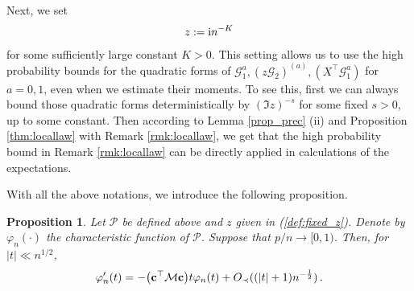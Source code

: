 \documentclass[12pt]{article}
\numberwithin{equation}{section}
\newtheorem{prop}{Proposition}
\theoremstyle{remark}
\newcommand{\1}{{\rm 1}\kern-0.24em{\rm I}}
\newcommand{\E}{{\rm I}\kern-0.18em{\rm E}}
\begin{document}
\begin{appendices}
 
 Next, we set 
\begin{align}\label{def:fixed_z}
z:= {\rm i} n^{-K}
\end{align}
for some sufficiently large constant $K>0$. This setting allows us to use the high probability bounds for the quadratic forms of $\mathcal{G}_1^{a}, (z\mathcal{G}_2)^{(a)}, ({X}^{\top} \mathcal{G}_1^{a})$  for $a=0,1$,  even when we estimate their moments. To see this, first we can always bound those quadratic forms deterministically by $(\Im z)^{-s}$ for some fixed $s>0$, up to some constant. Then according to Lemma \ref{prop_prec} (ii) and  Proposition \ref{thm:locallaw} with Remark \ref{rmk:locallaw}, we get that the high probability bound in Remark \ref{rmk:locallaw} can be directly  applied in calculations of the expectations.

With all the above notations, we introduce the following proposition.
 \begin{prop}\label{prop:rmeP}
 Let $ \mathcal{P}$ be defined above and $z$ given in (\ref{def:fixed_z}).  Denote by $\varphi_n(\cdot)$  the characteristic function of $ \mathcal{P}$. Suppose that $p/n\to[0,1)$.
Then, for $|t|\ll n^{1/2}$,
\begin{align*}
\varphi_n'(t) = - \big({\bf c}^{\top} \mathcal{M} {\bf c} \big) t \varphi_n(t)  + O_\prec((|t|+1) n^{-\frac 12})\,.
\end{align*}


 \end{prop}
 
 


\end{appendices}
\end{document}
